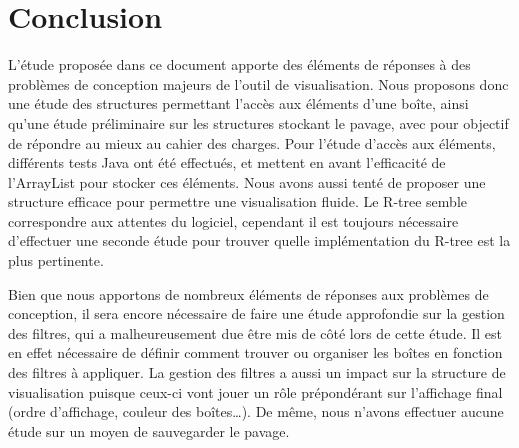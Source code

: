 \chapter{Conclusion}
L'étude proposée dans ce document apporte des éléments de réponses à des problèmes de conception majeurs de l'outil de visualisation. Nous proposons donc une étude des structures permettant l'accès aux éléments d'une boîte, ainsi qu'une étude préliminaire sur les structures stockant le pavage, avec pour objectif de répondre au mieux au cahier des charges. Pour l'étude d'accès aux éléments, différents tests Java ont été effectués, et mettent en avant l'efficacité de l'ArrayList pour stocker ces éléments. Nous avons aussi tenté de proposer une structure efficace pour permettre une visualisation fluide. Le R-tree semble correspondre aux attentes du logiciel, cependant il est toujours nécessaire d'effectuer une seconde étude pour trouver quelle implémentation du R-tree est la plus pertinente.

Bien que nous apportons de nombreux éléments de réponses aux problèmes de conception, il sera encore nécessaire de faire une étude approfondie sur la gestion des filtres, qui a malheureusement due être mis de côté lors de cette étude. Il est en effet nécessaire de définir comment trouver ou organiser les boîtes en fonction des filtres à appliquer. La gestion des filtres a aussi un impact sur la structure de visualisation puisque ceux-ci vont jouer un rôle prépondérant sur l'affichage final (ordre d'affichage, couleur des boîtes\dots). De même, nous n'avons effectuer aucune étude sur un moyen de sauvegarder le pavage.
